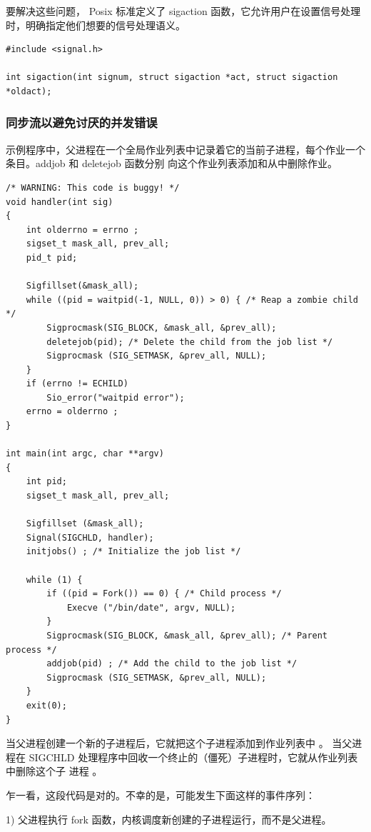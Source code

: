要解决这些问题， Posix 标准定义了 sigaction 函数，它允许用户在设置信号处理
时，明确指定他们想要的信号处理语义。

\begin{lstlisting}[style=CStyle]
#include <signal.h>

int sigaction(int signum, struct sigaction *act, struct sigaction *oldact);
\end{lstlisting}

\subsubsection{同步流以避免讨厌的并发错误}

示例程序中，父进程在一个全局作业列表中记录着它的当前子进程，每个作业一个条目。addjob 和 deletejob 函数分别
向这个作业列表添加和从中删除作业。

\begin{lstlisting}[style=CStyle]
/* WARNING: This code is buggy! */
void handler(int sig)
{
    int olderrno = errno ;
    sigset_t mask_all, prev_all;
    pid_t pid;

    Sigfillset(&mask_all);
    while ((pid = waitpid(-1, NULL, 0)) > 0) { /* Reap a zombie child */
        Sigprocmask(SIG_BLOCK, &mask_all, &prev_all);
        deletejob(pid); /* Delete the child from the job list */
        Sigprocmask (SIG_SETMASK, &prev_all, NULL);
    }
    if (errno != ECHILD)
        Sio_error("waitpid error");
    errno = olderrno ;
}
 
int main(int argc, char **argv)
{
    int pid;
    sigset_t mask_all, prev_all;

    Sigfillset (&mask_all);
    Signal(SIGCHLD, handler);
    initjobs() ; /* Initialize the job list */

    while (1) {
        if ((pid = Fork()) == 0) { /* Child process */
            Execve ("/bin/date", argv, NULL);
        }
        Sigprocmask(SIG_BLOCK, &mask_all, &prev_all); /* Parent process */
        addjob(pid) ; /* Add the child to the job list */
        Sigprocmask (SIG_SETMASK, &prev_all, NULL);
    }
    exit(0);
}
\end{lstlisting}

当父进程创建一个新的子进程后，它就把这个子进程添加到作业列表中 。 当父进程在
SIGCHLD 处理程序中回收一个终止的（僵死）子进程时，它就从作业列表中删除这个子
进程 。

乍一看，这段代码是对的。不幸的是，可能发生下面这样的事件序列：

1) 父进程执行 fork 函数，内核调度新创建的子进程运行，而不是父进程。

